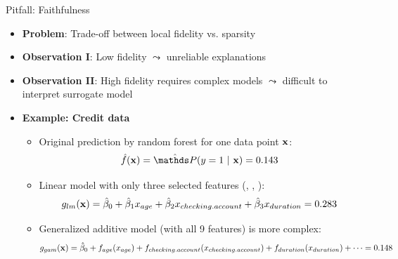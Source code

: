 \documentclass[11pt,compress,t,notes=noshow, aspectratio=169, xcolor=table]{beamer}
\newcommand{\betah}{\hat{\beta}}
\begin{document}
\begin{frame}[c]{Pitfall: Faithfulness}
\begin{itemize}
	\item \textbf{Problem}: Trade-off between local fidelity vs. sparsity
	\item \textbf{Observation I}: Low fidelity $\leadsto$ unreliable explanations
	\item \textbf{Observation II}: High fidelity requires complex models $\leadsto$ difficult to interpret surrogate model %
	\pause
	\item \textbf{Example: Credit data} 
	\begin{itemize}
	\itemsep0em
	    \item Original prediction by random forest for one data point $\xv$: 
	    $$\fh(\xv) = \hat{\P}(y = 1 ~|~ \xv) = 0.143$$
	    \item %
	    Linear model with only three selected features (, , ):
	    $$g_{lm}(\xv) = \betah_0 + \betah_1 x_{age} + \betah_2 x_{checking.account} + \betah_3 x_{duration} = 0.283$$
	    \item Generalized additive model (with all 9 features) is more complex:
    $$%
    g_{gam}(\xv) = \betah_0 + f_{age}(x_{age}) + f_{checking.account}(x_{checking.account}) + f_{duration}(x_{duration}) +  \dots %
    = 0.148$$
	\end{itemize}
\end{itemize}

\end{frame}
\end{document}
